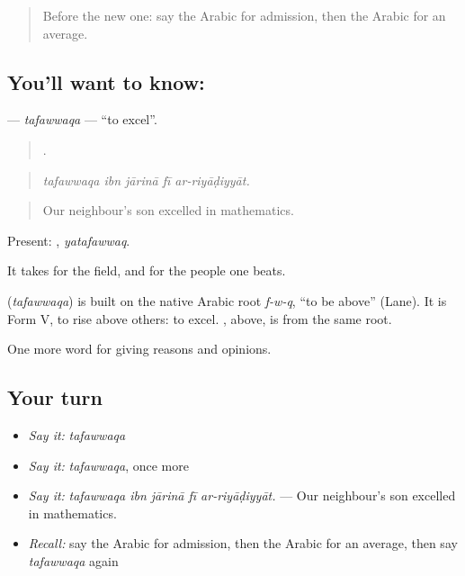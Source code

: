 \label{lesson:AR-C393-tafawwaqa}



\begin{quote}
Before the new one: say the Arabic for admission, then the Arabic for an average.
\end{quote}

\subsection*{You'll want to know: }
\textbf{} — \emph{tafawwaqa} — \textquotedblleft{}to excel\textquotedblright{}.

\begin{quote}
    .
\end{quote}

\begin{quote}
\emph{tafawwaqa ibn jārinā fī ar-riyāḍiyyāt.}
\end{quote}

\begin{quote}
Our neighbour's son excelled in mathematics.
\end{quote}

Present: , \emph{yatafawwaq}.

It takes  for the field, and  for the people one beats.

\begin{cousinweb}
\textbf{} (\emph{tafawwaqa}) is built on the native Arabic root \emph{f-w-q}, \textquotedblleft{}to be above\textquotedblright{} (Lane). It is Form V, to rise above others: to excel. , above, is from the same root.
\end{cousinweb}

\begin{grammarlens}[title={What you've built}]
One more word for giving reasons and opinions.
\end{grammarlens}

\subsection*{Your turn}
\begin{itemize}
\raggedright
  \item \emph{Say it:} \emph{tafawwaqa}
  \item \emph{Say it:} \emph{tafawwaqa}, once more
  \item \emph{Say it:} \emph{tafawwaqa ibn jārinā fī ar-riyāḍiyyāt.} — Our neighbour's son excelled in mathematics.
  \item \emph{Recall:} say the Arabic for admission, then the Arabic for an average, then say \emph{tafawwaqa} again
\end{itemize}

